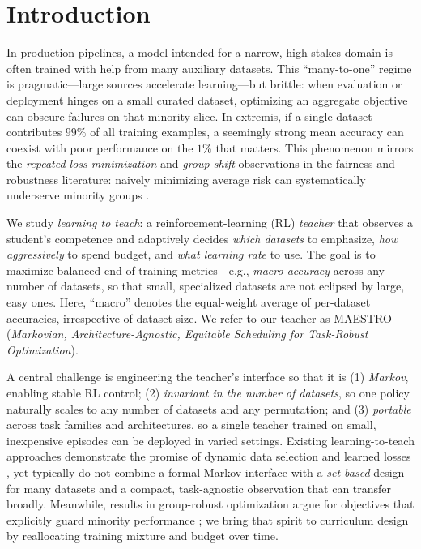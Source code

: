 \documentclass[11pt]{article}
\newcommand{\1}{\mathbf{1}}
\newcommand{\MAESTRO}{\textsc{MAESTRO}\xspace}
\begin{document}
\section{Introduction}
In production pipelines, a model intended for a narrow, high-stakes domain is often trained with help from many auxiliary datasets. This “many-to-one” regime is pragmatic—large sources accelerate learning—but brittle: when evaluation or deployment hinges on a small curated dataset, optimizing an aggregate objective can obscure failures on that minority slice. In extremis, if a single dataset contributes $99\%$ of all training examples, a seemingly strong mean accuracy can coexist with poor performance on the $1\%$ that matters. This phenomenon mirrors the \emph{repeated loss minimization} and \emph{group shift} observations in the fairness and robustness literature: naively minimizing average risk can systematically underserve minority groups \citep{hashimoto2018fairness,sagawa2020dro}.

We study \emph{learning to teach}: a reinforcement-learning (RL) \emph{teacher} that observes a student’s competence and adaptively decides \emph{which datasets} to emphasize, \emph{how aggressively} to spend budget, and \emph{what learning rate} to use. The goal is to maximize balanced end-of-training metrics—e.g., \emph{macro-accuracy} across any number of datasets, so that small, specialized datasets are not eclipsed by large, easy ones. Here, “macro” denotes the equal-weight average of per-dataset accuracies, irrespective of dataset size. We refer to our teacher as \MAESTRO{} (\emph{Markovian, Architecture-Agnostic, Equitable Scheduling for Task-Robust Optimization}).

A central challenge is engineering the teacher’s interface so that it is (1) \emph{Markov}, enabling stable RL control; (2) \emph{invariant in the number of datasets}, so one policy naturally scales to any number of datasets and any permutation; and (3) \emph{portable} across task families and architectures, so a single teacher trained on small, inexpensive episodes can be deployed in varied settings. Existing learning-to-teach approaches demonstrate the promise of dynamic data selection and learned losses \citep{fan2018l2t,wu2018l2tloss}, yet typically do not combine a formal Markov interface with a \emph{set-based} design for many datasets and a compact, task-agnostic observation that can transfer broadly. Meanwhile, results in group-robust optimization argue for objectives that explicitly guard minority performance \citep{hashimoto2018fairness,sagawa2020dro}; we bring that spirit to curriculum design by reallocating training mixture and budget over time.
\end{document}
